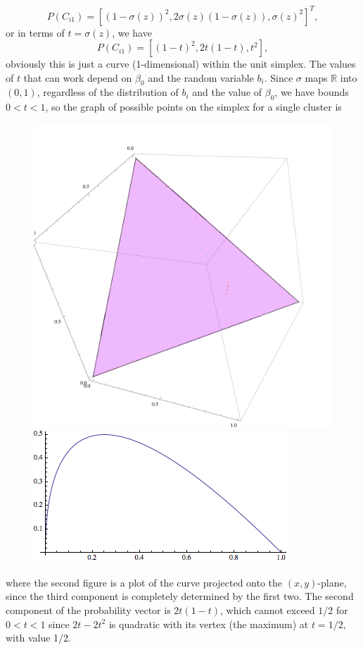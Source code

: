 \documentclass[11pt]{article}
\newcommand{\R}{\mathbb{R}}
\begin{document}
\begin{enumerate}
\begin{enumerate}
			\[
				P(C_{i1}) = [(1-\sigma(z))^2,2\sigma(z)(1-\sigma(z)), \sigma(z)^2]^T,
			\]
			or in terms of $t=\sigma(z)$, we have
			\[
				P(C_{i1}) = [(1-t)^2,2t(1-t),t^2],
			\]
			obviously this is just a curve (1-dimensional) within the unit simplex. The values of $t$ that can work depend on $\beta_0$ and the random variable $b_i$. Since $\sigma$ maps $\R$ into $(0,1)$, regardless of the distribution of $b_i$ and the value of $\beta_0$, we have bounds $0<t<1$, so the graph of possible points on the simplex for a single cluster is
			\begin{figure}[H]
				\includegraphics[scale=0.5]{plot1}
				\includegraphics[scale=0.5]{projplot2c}
			\end{figure}
			where the second figure is a plot of the curve projected onto the $(x,y)$-plane, since the third component is completely determined by the first two. The second component of the probability vector is $2t(1-t)$, which cannot exceed $1/2$ for $0<t<1$ since $2t-2t^2$ is quadratic with its vertex (the maximum) at $t=1/2$, with value 1/2.

\end{enumerate}
\end{enumerate}
\end{document}
